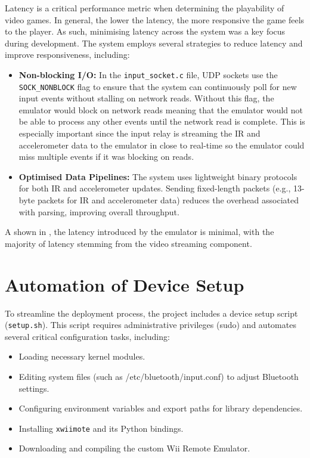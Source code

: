 Latency is a critical performance metric when determining the playability of video games. In general, the lower the latency, the more responsive the game feels to the player. As such, minimising latency across the system was a key focus during development. The system employs several strategies to reduce latency and improve responsiveness, including:

\begin{itemize}
	\item \textbf{Non-blocking I/O:} In the \texttt{input\_socket.c} file, UDP
	      sockets use the \linebreak \texttt{SOCK\_NONBLOCK} flag to ensure that the system
	      can continuously poll for new input events without stalling on network reads.
	      Without this flag, the emulator would block on network reads meaning that the
	      emulator would not be able to process any other events until the network read is
	      complete. This is especially important since the input relay is streaming the IR
	      and accelerometer data to the emulator in close to real-time so the emulator
	      could miss multiple events if it was blocking on reads.
	\item \textbf{Optimised Data Pipelines:} The system uses lightweight binary
	      protocols for both IR and accelerometer updates. Sending fixed-length packets
	      (e.g., 13-byte packets for IR and accelerometer data) reduces the overhead associated
	      with parsing, improving overall throughput.

\end{itemize}

A shown in , the latency introduced by the emulator is minimal, with the majority of latency stemming from the video streaming component.

\section{Automation of Device Setup}

To streamline the deployment process, the project includes a device setup script (\texttt{setup.sh}). This script requires administrative privileges (sudo) and automates several critical configuration tasks, including:

\begin{itemize}

	\item Loading necessary kernel modules.
	\item Editing system files (such as /etc/bluetooth/input.conf) to adjust Bluetooth settings.
	\item Configuring environment variables and export paths for library dependencies.
	\item Installing \texttt{xwiimote} and its Python bindings.
	\item Downloading and compiling the custom Wii Remote Emulator.
\end{itemize}

